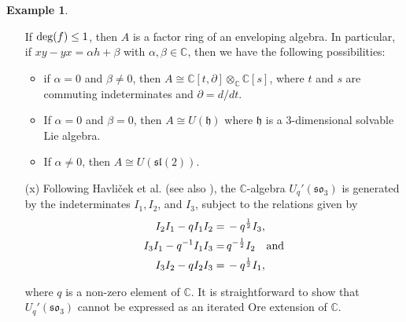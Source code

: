 \documentclass{amsart}
\theoremstyle{definition}
\newtheorem{example}[theorem]{Example}
\theoremstyle{remark}
\numberwithin{equation}{section}
\begin{document}
\begin{example}
\begin{enumerate}
If ${\rm deg}(f) \le 1$, then $A$ is a factor ring of an enveloping algebra. In particular, if $xy - yx = \alpha h + \beta$ with $\alpha, \beta \in \mathbb{C}$, then we have the following possibilities:
\begin{itemize}
    \item if $\alpha = 0$ and $\beta \neq 0$, then $A \cong \mathbb{C}[t, \partial] \otimes_{\mathbb{C}} \mathbb{C}[s]$, where $t$ and $s$ are commuting indeterminates and $\partial = d/dt$.

    \item If $\alpha = 0$ and $\beta = 0$, then $A\cong U(\mathfrak{h})$ where $\mathfrak{h}$ is a 3-dimensional solvable Lie algebra.

    \item If $\alpha \neq 0$, then $A\cong U(\mathfrak{sl}(2))$.
\end{itemize}

\item [\rm (x)] Following Havli\v{c}ek et al. \cite[p. 79]{HavlicekKlimykPosta2000} (see also \cite{Fairlie1990, Odesskii1986}), the $ \mathbb{C}$-algebra $U_q'(\mathfrak{so}_3)$ is generated by the indeterminates $I_1, I_2$, and $I_3$, subject to the relations given by
\begin{align*}
I_2I_1 - qI_1I_2 = &\, -q^{\frac{1}{2}}I_3, \\ 
I_3I_1 - q^{-1}I_1I_3 = &\, q^{-\frac{1}{2}}I_2 \quad {\rm and} \\ 
I_3I_2 - qI_2I_3 = &\, -q^{\frac{1}{2}}I_1,
\end{align*}

where $q$ is a non-zero element of $\mathbb{C}$. It is straightforward to show that $U_q'(\mathfrak{so}_3)$ cannot be expressed as an iterated Ore extension of $\mathbb{C}$.  
\end{enumerate}
\end{example}
\end{document}

